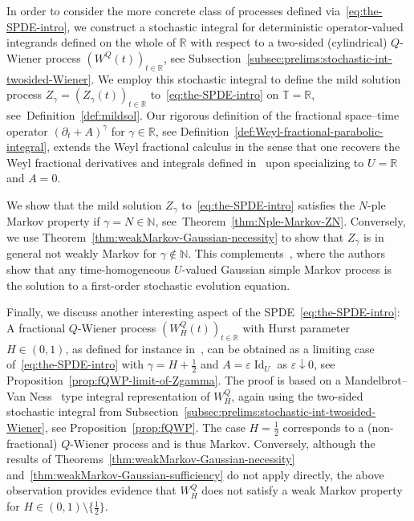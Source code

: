 \documentclass[reqno]{amsart}
\numberwithin{equation}{section}
\newcommand{\bbR}{\mathbb{R}}
\newcommand{\bbT}{\mathbb{T}}
\newcommand{\R}{\mathbb{R}}
\newcommand{\N}{\mathbb{N}}
\newcommand{\id}{\operatorname{Id}}
\theoremstyle{remark}
\theoremstyle{definition}
\begin{document}
In order to consider the more concrete class of processes defined via~\eqref{eq:the-SPDE-intro},
we construct
a stochastic integral for deterministic operator-valued integrands defined on the
whole of $\bbR$ with respect to a two-sided (cylindrical)
$Q$-Wiener process $(W^Q(t))_{t\in\bbR}$, see Subsection~\ref{subsec:prelims:stochastic-int-twosided-Wiener}.
We employ this stochastic integral to
define the mild solution process $Z_\gamma = (Z_\gamma(t))_{t\in\R}$ to~\eqref{eq:the-SPDE-intro}
on $\bbT = \bbR$, see~Definition~\ref{def:mildsol}.
Our rigorous definition of the
fractional space--time operator $(\partial_t + A)^\gamma$ for $\gamma \in \R$,
see Definition~\ref{def:Weyl-fractional-parabolic-integral},
extends the Weyl fractional calculus in the sense that one recovers the Weyl fractional derivatives and integrals
defined in~\cite[Section~2.3]{KST2006} upon specializing to $U = \R$ and $A = 0$.

We show that the mild solution $Z_\gamma$ to~\eqref{eq:the-SPDE-intro}
satisfies the $N$-ple Markov property if $\gamma = N \in \N$, see~Theorem~\ref{thm:Nple-Markov-ZN}.
Conversely, we use Theorem~\ref{thm:weakMarkov-Gaussian-necessity} to show that
$Z_\gamma$ is in general not weakly Markov for $\gamma\not\in\N$. 
This complements~\cite[Theorem~2.7]{GoldysatZabczyk2016}, where the authors show that any 
time-homogeneous $U$-valued Gaussian simple Markov process is the solution to a first-order stochastic evolution equation.

Finally, we discuss another interesting aspect of
the SPDE~\eqref{eq:the-SPDE-intro}: A fractional $Q$-Wiener process $(W_H^Q(t))_{t\in\bbR}$ with Hurst parameter $H \in (0,1)$,
as defined for instance in~\cite{Duncan2002}, can be obtained
as a limiting case of~\eqref{eq:the-SPDE-intro}
with $\gamma = H + \frac{1}{2}$ and $A = \varepsilon \id_U$ as $\varepsilon \downarrow 0$, see Proposition~\ref{prop:fQWP-limit-of-Zgamma}.
The proof is based on a Mandelbrot--Van Ness~\cite{MandelbrotVanNess1968} type
integral representation of $W^Q_H$, again using the two-sided stochastic integral from Subsection~\ref{subsec:prelims:stochastic-int-twosided-Wiener}, 
see Proposition~\ref{prop:fQWP}.
The case $H = \frac{1}{2}$ corresponds to a (non-fractional)
$Q$-Wiener process and is thus Markov. Conversely, although
the results of Theorems~\ref{thm:weakMarkov-Gaussian-necessity} and~\ref{thm:weakMarkov-Gaussian-sufficiency} do not
apply directly, the above observation
provides evidence that $W^Q_H$ does not satisfy a weak Markov property 
for $H \in (0,1) \setminus \{\frac{1}{2}\}$.
\end{document}
